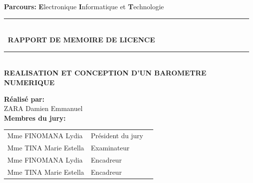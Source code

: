\documentclass[a4paper,12pt]{report}
\begin{document}
\begin{titlepage}
\begin{center}
\textsc{\Large}
{\large \bfseries Parcours: }
{\large \textbf{E}lectronique \textbf{I}nformatique et \textbf{T}echnologie }\\[1cm]




\rule{\linewidth}{0.2mm} \\[0.4cm]
{ \bfseries\ RAPPORT DE MEMOIRE DE LICENCE \\[0.1cm] }
\rule{\linewidth}{0.2mm} \\[3cm]



\textsc{\huge}
{\huge \bfseries\color{blue} REALISATION ET CONCEPTION D'UN BAROMETRE NUMERIQUE  \\[3cm] }



\begin{minipage}{0.8\textwidth}
  \begin{flushleft} \large
    \large \textbf{Réalisé par:}\\
    \setlength{\indent}
    \textsc{ZARA} Damien Emmanuel \\[1cm]
    \large \textbf{Membres du jury:}\\
    	\begin{center}
    		\begin{tabular}{l@{\hskip 1cm}l@{\hskip 1cm}l}
				Mme \textsc{FINOMANA} Lydia   & Président du jury \\
				Mme  \textsc{TINA} Marie Estella & Examinateur\\
				Mme \textsc{FINOMANA} Lydia   & Encadreur \\
				Mme  \textsc{TINA} Marie Estella & Encadreur\\
			\end{tabular}\\[5mm]
    	
    	\end{center}
    
    
    



\end{flushleft}
\end{minipage}
\end{center}
\end{titlepage}
\end{document}
